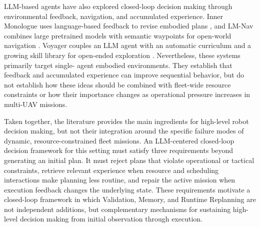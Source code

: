 LLM-based agents have also explored closed-loop decision making through
environmental feedback, navigation, and accumulated experience. Inner Monologue
uses language-based feedback to revise embodied plans
\cite{huang2023innermonologue},
and LM-Nav combines large pretrained models with semantic waypoints for
open-world navigation \cite{shah2023lmnav}. Voyager couples an LLM agent with
an automatic curriculum and a growing skill library for open-ended exploration
\cite{wang2023voyager}. Nevertheless, these systems primarily target single-
agent embodied environments. They establish that feedback and accumulated
experience can improve sequential behavior, but do not establish how these
ideas should be combined with fleet-wide resource constraints or how their
importance changes as operational pressure increases in multi-UAV missions.

Taken together, the literature provides the main ingredients for high-level
robot decision making, but not their integration around the specific failure
modes of dynamic, resource-constrained fleet missions. An LLM-centered
closed-loop decision framework for this setting must satisfy three requirements
beyond generating an initial plan. It must reject plans that violate operational
or tactical constraints, retrieve relevant experience when resource and scheduling
interactions make planning less routine, and repair the active mission when
execution feedback changes the underlying state. These requirements motivate a
closed-loop framework in which Validation, Memory, and Runtime Replanning are
not independent additions, but complementary mechanisms for sustaining
high-level decision making from initial observation through execution.

\endinput

